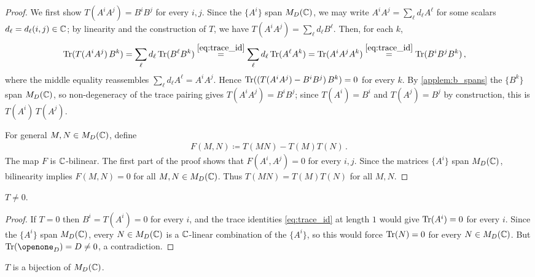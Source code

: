 \begin{proof}
    We first show $T(A^i A^j) = B^i B^j$ for every $i, j$. Since the $\{A^i\}$ span $M_D(\mathbb{C})$, we may write $A^i A^j = \sum_\ell d_\ell A^\ell$ for some scalars $d_\ell = d_\ell(i, j) \in \mathbb{C}$; by linearity and the construction of $T$, we have $T(A^i A^j) = \sum_\ell d_\ell B^\ell$. Then, for each $k$,
    \begin{align}
        \operatorname{Tr}(T(A^i A^j)\, B^k)
         &=  \sum_\ell d_\ell \operatorname{Tr}(B^\ell B^k)                                \stackrel{\eqref{eq:trace_id}}{=}  \sum_\ell d_\ell \operatorname{Tr}(A^\ell A^k)
        =  \operatorname{Tr}(A^i A^j A^k)
        \stackrel{\eqref{eq:trace_id}}{=}  \operatorname{Tr}(B^i B^j B^k)\,,
    \end{align}
    where the middle equality reassembles $\sum_\ell d_\ell A^\ell = A^i A^j$. Hence $\operatorname{Tr}((T(A^i A^j) - B^i B^j)\, B^k) = 0$ for every $k$. By \cref{applem:b_spans} the $\{B^k\}$ span $M_D(\mathbb{C})$, so non-degeneracy of the trace pairing gives $T(A^i A^j) = B^i B^j$; since $T(A^i) = B^i$ and $T(A^j) = B^j$ by construction, this is $T(A^i)\,T(A^j)$.

    For general $M,N\in M_D(\mathbb{C})$, define
    \begin{align}
        F(M,N)\coloneqq T(MN)-T(M)T(N)\,.
    \end{align}
    The map $F$ is $\mathbb{C}$-bilinear. The first part of the proof shows that
    $F(A^i,A^j)=0$ for every $i,j$. Since the matrices $\{A^i\}$ span
    $M_D(\mathbb{C})$, bilinearity implies $F(M,N)=0$ for all $M,N\in M_D(\mathbb{C})$.
    Thus $T(MN)=T(M)T(N)$ for all $M,N$.
\end{proof}

\begin{applem}[Nonvanishing]\label{applem:nonzero}
    $T \ne 0$.
\end{applem}

\begin{proof}
    If $T = 0$ then $B^i = T(A^i) = 0$ for every $i$, and the trace identities \cref{eq:trace_id} at length $1$ would give $\operatorname{Tr}(A^i) = 0$ for every $i$. Since the $\{A^i\}$ span $M_D(\mathbb{C})$, every $N \in M_D(\mathbb{C})$ is a $\mathbb{C}$-linear combination of the $\{A^i\}$, so this would force $\operatorname{Tr}(N) = 0$ for every $N \in M_D(\mathbb{C})$. But $\Tr(\openone_D) = D \ne 0$, a contradiction.
\end{proof}

\begin{applem}[Bijectivity]\label{applem:bij}
    $T$ is a bijection of $M_D(\mathbb{C})$.
\end{applem}

